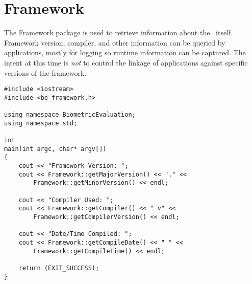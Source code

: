 %
%
\chapter{Framework}
The Framework package is used to retrieve information about the \lname\ itself.
Framework version, compiler, and other information can be queried by
applications, mostly
for logging so runtime information can be captured. The intent at this time
is {\em not} to control the linkage of applications against specific
versions of the framework.
\label{chp-framework}

\lstset{language=c++}
\begin{lstlisting}[caption={Using a the Framework API}, label=frameworkuse]
#include <iostream>
#include <be_framework.h>

using namespace BiometricEvaluation;
using namespace std;

int
main(int argc, char* argv[])
{
    cout << "Framework Version: ";
    cout << Framework::getMajorVersion() << "." <<
        Framework::getMinorVersion() << endl;

    cout << "Compiler Used: ";
    cout << Framework::getCompiler() << " v" <<
        Framework::getCompilerVersion() << endl;

    cout << "Date/Time Compiled: ";
    cout << Framework::getCompileDate() << " " <<
        Framework::getCompileTime() << endl;

    return (EXIT_SUCCESS);
}
\end{lstlisting}
